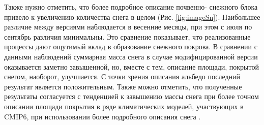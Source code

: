 \documentclass[a4paper, fontsize=14pt]{scrartcl}
\begin{document}
Также нужно отметить, что более подробное описание почвенно- снежного блока привело к увеличению количества снега в целом (Рис. \ref{fig:imageSn}). Наибольшее различие между версиями наблюдается в весенние месяцы, при этом с июля по сентябрь различия минимальны. Это сравнение показывает, что реализованные процессы дают ощутимый вклад в образование снежного покрова.  В сравнении с данными наблюдений суммарная масса снега в случае модифицированной версии оказывается заметно завышенной, но, вместе с тем, описание площади, покрытой снегом, наоборот, улучшается. С точки зрения описания альбедо последний результат является положительным. Также можно отметить, что полученные результаты согласуется с тенденцией к завышению массы снега при более точном описании площади покрытия в ряде климатических моделей, участвующих в CMIP6, при использовании более подробного описания снега \cite{Mudryk2020}.
\end{document}
